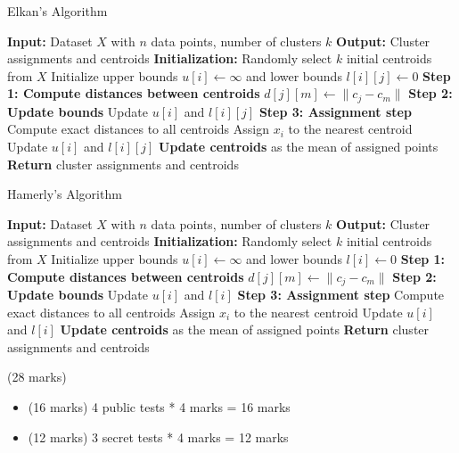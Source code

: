 \documentclass[12pt]{article}
\begin{document}
\begin{algorithm}[h]
    \caption{Elkan's Algorithm}
    \label{alg:elkan}
    \begin{algorithmic}[1]
        \STATE \textbf{Input:} Dataset $X$ with $n$ data points, number of clusters $k$
        \STATE \textbf{Output:} Cluster assignments and centroids
        \STATE \textbf{Initialization:}
        \STATE Randomly select $k$ initial centroids from $X$
        \STATE Initialize upper bounds $u[i] \gets \infty$ and lower bounds $l[i][j] \gets 0$
        \REPEAT
        \STATE \textbf{Step 1: Compute distances between centroids}
        \STATE $d[j][m] \gets \|c_j - c_m\|$
        \ENDFOR
        \STATE \textbf{Step 2: Update bounds}
        \STATE Update $u[i]$ and $l[i][j]$
        \ENDFOR
        \STATE \textbf{Step 3: Assignment step}
        \STATE Compute exact distances to all centroids
        \STATE Assign $x_i$ to the nearest centroid
        \STATE Update $u[i]$ and $l[i][j]$
        \ENDIF
        \ENDFOR
        \STATE \textbf{Update centroids} as the mean of assigned points
        \STATE \textbf{Return} cluster assignments and centroids
    \end{algorithmic}
\end{algorithm}

\begin{algorithm}[h]
    \caption{Hamerly's Algorithm}
    \label{alg:hamerly}
    \begin{algorithmic}[1]
        \STATE \textbf{Input:} Dataset $X$ with $n$ data points, number of clusters $k$
        \STATE \textbf{Output:} Cluster assignments and centroids
        \STATE \textbf{Initialization:}
        \STATE Randomly select $k$ initial centroids from $X$
        \STATE Initialize upper bounds $u[i] \gets \infty$ and lower bounds $l[i] \gets 0$
        \REPEAT
        \STATE \textbf{Step 1: Compute distances between centroids}
        \STATE $d[j][m] \gets \|c_j - c_m\|$
        \ENDFOR
        \STATE \textbf{Step 2: Update bounds}
        \STATE Update $u[i]$ and $l[i]$
        \ENDFOR
        \STATE \textbf{Step 3: Assignment step}
        \STATE Compute exact distances to all centroids
        \STATE Assign $x_i$ to the nearest centroid
        \STATE Update $u[i]$ and $l[i]$
        \ENDIF
        \ENDFOR
        \STATE \textbf{Update centroids} as the mean of assigned points
        \STATE \textbf{Return} cluster assignments and centroids
    \end{algorithmic}
\end{algorithm}

\begin{markscheme} (28 marks)
    \begin{itemize}
        \item (16 marks) 4 public tests * 4 marks = 16 marks
        \item (12 marks) 3 secret tests * 4 marks = 12 marks
    \end{itemize}
\end{markscheme}




\end{document}

